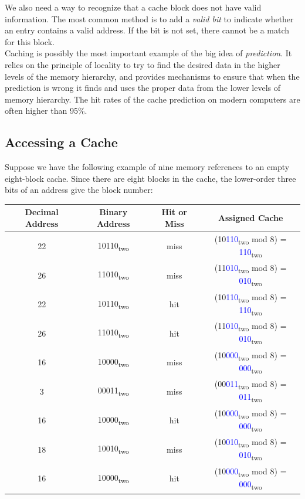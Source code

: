 \documentclass[12pt]{article}
\theoremstyle{definition}
\begin{document}
  We also need a way to recognize that a cache block does not have valid information.
  The most common method is to add a \emph{valid bit} to indicate whether an entry contains a valid address.
  If the bit is not set, there cannot be a match for this block. \\

  Caching is possibly the most important example of the big idea of \emph{prediction}.
  It relies on the principle of locality to try to find the desired data in the higher levels of the memory hierarchy, and provides mechanisms to ensure that when the prediction is wrong it finds and uses the proper data from the lower levels of memory hierarchy.
  The hit rates of the cache prediction on modern computers are often higher than 95\%.

  \subsection{Accessing a Cache}
  Suppose we have the following example of nine memory references to an empty eight-block cache.
  Since there are eight blocks in the cache, the lower-order three bits of an address give the block number:
  \begin{center}
  \begin{tabular}{| c | c | c | c |}
  \hline
  Decimal Address & Binary Address & Hit or Miss & Assigned Cache \\ \hline
  22 & 10110\textsubscript{two} & miss & (10\textcolor{blue}{110}\textsubscript{two} mod 8) = \textcolor{blue}{110}\textsubscript{two} \\ \hline
  26 & 11010\textsubscript{two} & miss & (11\textcolor{blue}{010}\textsubscript{two} mod 8) = \textcolor{blue}{010}\textsubscript{two} \\ \hline
  22 & 10110\textsubscript{two} & hit & (10\textcolor{blue}{110}\textsubscript{two} mod 8) = \textcolor{blue}{110}\textsubscript{two} \\ \hline
  26 & 11010\textsubscript{two} & hit & (11\textcolor{blue}{010}\textsubscript{two} mod 8) = \textcolor{blue}{010}\textsubscript{two} \\ \hline
  16 & 10000\textsubscript{two} & miss & (10\textcolor{blue}{000}\textsubscript{two} mod 8) = \textcolor{blue}{000}\textsubscript{two} \\ \hline
  3 & 00011\textsubscript{two} & miss & (00\textcolor{blue}{011}\textsubscript{two} mod 8) = \textcolor{blue}{011}\textsubscript{two} \\ \hline
  16 & 10000\textsubscript{two} & hit & (10\textcolor{blue}{000}\textsubscript{two} mod 8) = \textcolor{blue}{000}\textsubscript{two} \\ \hline
  18 & 10010\textsubscript{two} & miss & (10\textcolor{blue}{010}\textsubscript{two} mod 8) = \textcolor{blue}{010}\textsubscript{two} \\ \hline
  16 & 10000\textsubscript{two} & hit & (10\textcolor{blue}{000}\textsubscript{two} mod 8) = \textcolor{blue}{000}\textsubscript{two} \\ \hline
  \end{tabular}
  \end{center}
\end{document}
